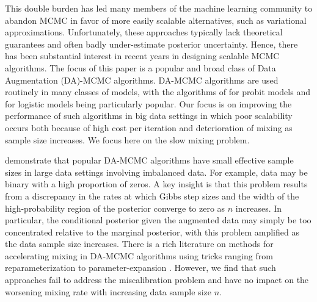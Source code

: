 \documentclass[twoside,11pt]{article}
\newcommand{\1}{\mathbf 1}
\begin{document}
{This double burden has led many members of the machine learning community to abandon MCMC in favor of more easily scalable alternatives, such as variational approximations. Unfortunately, these approaches typically lack theoretical guarantees and often badly under-estimate posterior uncertainty.  Hence, there has been substantial interest in recent years in designing scalable MCMC algorithms.  The focus of this paper is a popular and broad class of Data Augmentation (DA)-MCMC algorithms.  DA-MCMC algorithms are used routinely in many classes of models, with the algorithms of \cite{albert1993bayesian} for probit models and \cite{polson2013bayesian} for logistic models being particularly popular.  Our focus is on improving the performance of such algorithms in big data settings in which poor scalability occurs both because of high cost per iteration and deterioration of mixing as sample size increases. %
We focus here on the slow mixing problem.}

{ \cite{johndrow2016inefficiency} demonstrate that popular DA-MCMC algorithms have small effective sample sizes in large data settings involving imbalanced data. For example, data may be binary with a high proportion of zeros. A key insight is that this problem results from a discrepancy in the rates at which Gibbs step sizes and the width of the high-probability region of the posterior converge to zero as $n$ increases. In particular, the conditional posterior given the augmented data may simply be too concentrated relative to the marginal posterior, with this problem amplified as the data sample size increases.  There is a rich literature on methods for accelerating mixing in DA-MCMC algorithms using tricks ranging from reparameterization to parameter-expansion \citep{liu1999parameter,meng1999seeking,papaspiliopoulos2007general}.  However, we find that such approaches fail to address the miscalibration problem and have no impact on the worsening mixing rate with increasing data sample size $n$.}
\end{document}
